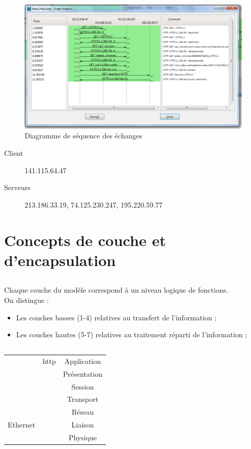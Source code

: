 \documentclass[a4paper, 11pt]{article}
\newcommand{\http}{\bsc{http}}
\newcommand{\osi}{\bsc{osi}}
\newcommand{\dns}{\bsc{dns}}
\newcommand{\udp}{\bsc{udp}}
\newcommand{\ip}{\bsc{ip}}
\newcommand{\tcp}{\bsc{tcp}}
\newcommand{\ftp}{\bsc{ftp}}
\newcommand{\arp}{\bsc{ftp}}
\begin{document}
	\subsection{}
		\begin{figure}[H]
			\centering
			\includegraphics[width=17cm]{screen1.png}
			\caption{Diagramme de séquence des échanges \http}
		\end{figure}
		\begin{description}
			\item[Client] 141.115.64.47
			\item[Serveurs] 213.186.33.19, 74.125.230.247, 195.220.59.77
		\end{description}
	\section{Concepts de couche et d'encapsulation}
	\subsection{}
	Chaque couche du modèle \osi correspond à un niveau logique de fonctions.\\
	On distingue :
	\begin{itemize}
		\item Les couches basses (1-4) relatives au transfert de l’information ;
		\item Les couches hautes (5-7) relatives au traitement réparti de l’information ;
	\end{itemize}

	\subsection{}
	\begin{tabular}{|c|c|c|}
		\hline
		\dns & http & Application\\
		&\ftp&Présentation\\
		&&Session\\
		\hline
		\udp&\tcp&Transport\\
		\ip&\arp&Réseau\\
		Ethernet&&Liaison\\
		&&Physique\\
		\hline
	\end{tabular}
\end{document}
